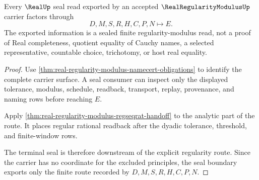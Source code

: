 \begin{theorem}
\label{thm:real-regularity-modulus-real-seal-boundary}
Every $\RealUp$ seal read exported by an accepted $\RealRegularityModulusUp$ carrier factors through
$$
D,M,S,R,H,C,P,N\longmapsto E .
$$
The exported information is a sealed finite regularity-modulus read, not a proof of Real completeness, quotient equality of Cauchy names, a selected representative, countable choice, trichotomy, or host real equality.
\end{theorem}
\begin{proof}
Use \autoref{thm:real-regularity-modulus-namecert-obligations} to identify the complete carrier surface. A seal consumer can inspect only the displayed tolerance, modulus, schedule, readback, transport, replay, provenance, and naming rows before reaching $E$.

Apply \autoref{thm:real-regularity-modulus-regseqrat-handoff} to the analytic part of the route. It places regular rational readback after the dyadic tolerance, threshold, and finite-window rows.

The terminal seal is therefore downstream of the explicit regularity route. Since the carrier has no coordinate for the excluded principles, the seal boundary exports only the finite route recorded by $D,M,S,R,H,C,P,N$.
\end{proof}


\begin{closurestatus}{\RealRegularityModulusUp}
  \theoryclosure{\seedClosure}
  \formalstatus{\unformalizedV}
\end{closurestatus}
